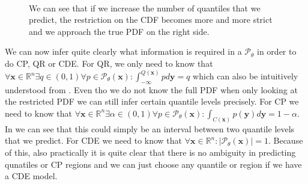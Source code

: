 \begin{figure}
    \centering
    \\

    \caption{We can see that if we increase the number of quantiles that we predict, the restriction on the CDF becomes more and more strict and we approach the true PDF on the right side.}
\end{figure}

We can now infer quite clearly what information is required in a $\mathscr{P}_{\theta}$ in order to do CP, QR or CDE. For QR, we only need to know that
$\forall \mathbf{x} \in \mathbb{R}^n \exists q \in (0,1) \forall p\in \mathscr{P}_{\theta}(\mathbf{x}): \int_{-\infty}^{Q(\mathbf{x})} p d\mathbf{y} = q$ which can also be intuitively understood from . Even tho we do not know the full PDF when only looking at the restricted PDF we can still infer certain quantile levels precisely. For CP we need to know that $\forall \mathbf{x} \in \mathbb{R}^n \exists \alpha \in (0,1) \forall p\in \mathscr{P}_{\theta}(\mathbf{x}): \int_{C(\mathbf{x})} p(\mathbf{y}) d\mathbf{y} = 1 - \alpha$. In  we can see that this could simply be an interval between two quantile levels that we predict. For CDE we need to know that $\forall \mathbf{x} \in \mathbb{R}^n: |\mathscr{P}_{\theta}(\mathbf{x})| = 1$. Because of this, also practically it is quite clear that there is no ambiguity in predicting qunatiles or CP regions and we can just choose any quantile or region if we have a CDE model.


